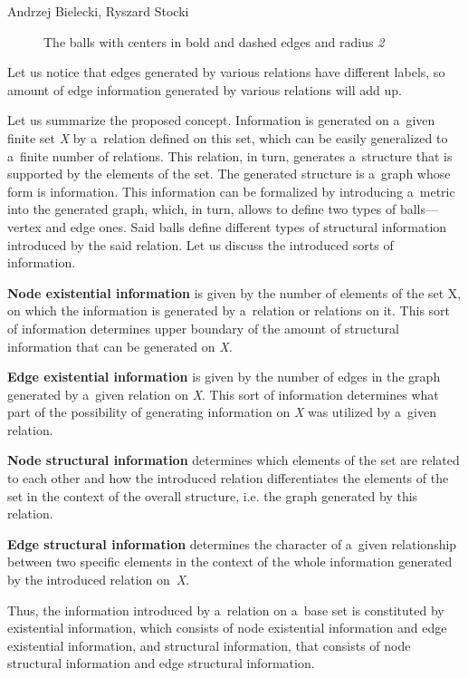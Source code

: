 \begin{artengenv2auth}{Andrzej Bielecki, Ryszard Stocki}
\begin{figure}[htbp]
 \caption{The balls with centers in bold and dashed edges and radius \textit{2}}
 \label{bie:fig3}
\end{figure}






Let us notice that edges generated by various relations have different labels, so amount of edge information generated by various relations will add up.



Let us summarize the proposed concept. Information is generated on a~given finite set \textit{X} by a~relation defined on this set, which can be easily generalized to a~finite number of relations. This relation, in turn, generates a~structure that is supported by the elements of the set. The generated structure is a~graph whose form is information. This information can be formalized by introducing a~metric into the generated graph, which, in turn, allows to define two types of balls---vertex and edge ones. Said balls define different types of structural information introduced by the said relation. Let us discuss the introduced sorts of information.



\textbf{Node existential information} is given by the number of elements of the set X, on which the information is generated by a~relation or relations on it. This sort of information determines upper boundary of the amount of structural information that can be generated on \textit{X}.



\textbf{Edge existential information} is given by the number of edges in the graph generated by a~given relation on \textit{X}. This sort of information determines what part of the possibility of generating information on \textit{X} was utilized by a~given relation.



\textbf{Node structural information} determines which elements of the set are related to each other and how the introduced relation differentiates the elements of the set in the context of the overall structure, i.e. the graph generated by this relation.



\textbf{Edge structural information} determines the character of a~given relationship between two specific elements in the context of the whole information generated by the introduced relation on~\textit{X}.


Thus, the information introduced by a~relation on a~base set is constituted by existential information, which consists of node existential information and edge existential information, and structural information, that consists of node structural information and edge structural information.




\end{artengenv2auth}
